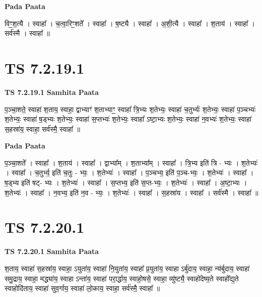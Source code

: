 \documentclass[17pt]{extarticle}
\begin{document}
\textbf{Pada Paata} \newline

विꣳ॒॒श॒त्यै । स्वाहा᳚ । च॒त्वा॒रिꣳ॒॒शते᳚ । स्वाहा᳚ । ष॒ष्ट्यै । स्वाहा᳚ । अ॒शी॒त्यै । स्वाहा᳚ । श॒ताय॑ । स्वाहा᳚ । सर्व॑स्मै । स्वाहा᳚ ॥  \newline




\section*{ TS 7.2.19.1 }

\textbf{TS 7.2.19.1 } \newline
\textbf{Samhita Paata} \newline

प॒ञ्चा॒शते॒ स्वाहा॑ श॒ताय॒ स्वाहा॒ द्वाभ्याꣳ॑ श॒ताभ्याꣳ॒॒ स्वाहा᳚ त्रि॒भ्यः श॒तेभ्यः॒ स्वाहा॑ च॒तुर्भ्यः॑ श॒तेभ्यः॒ स्वाहा॑ प॒ञ्चभ्यः॑ श॒तेभ्यः॒ स्वाहा॑ ष॒ड्भ्यः श॒तेभ्यः॒ स्वाहा॑ स॒प्तभ्यः॑ श॒तेभ्यः॒ स्वाहा᳚ ऽष्टा॒भ्यः श॒तेभ्यः॒ स्वाहा॑ न॒वभ्यः॑ श॒तेभ्यः॒ स्वाहा॑ स॒हस्रा॑य॒ स्वाहा॒ सर्व॑स्मै॒ स्वाहा᳚ ॥ \newline

\textbf{Pada Paata} \newline

प॒ञ्चा॒शते᳚ । स्वाहा᳚ । श॒ताय॑ । स्वाहा᳚ । द्वाभ्या᳚म् । श॒ताभ्या᳚म् । स्वाहा᳚ । त्रि॒भ्य इति॑ त्रि - भ्यः । श॒तेभ्यः॑ । स्वाहा᳚ । च॒तुर्भ्य॒ इति॑ च॒तुः - भ्यः॒ । श॒तेभ्यः॑ । स्वाहा᳚ । प॒ञ्चभ्य॒ इति॑ प॒ञ्च-भ्यः॒ । श॒तेभ्यः॑ । स्वाहा᳚ । ष॒ड्भ्य इति॑ षट्- भ्यः । श॒तेभ्यः॑ । स्वाहा᳚ । स॒प्तभ्य॒ इति॑ स॒प्त-भ्यः॒ । श॒तेभ्यः॑ । स्वाहा᳚ । अ॒ष्टा॒भ्यः । श॒तेभ्यः॑ । स्वाहा᳚ । न॒वभ्य॒ इति॑ न॒व - भ्यः॒ । श॒तेभ्यः॑ । स्वाहा᳚ । स॒हस्रा॑य । स्वाहा᳚ । सर्व॑स्मै । स्वाहा᳚ ॥  \newline




\section*{ TS 7.2.20.1 }

\textbf{TS 7.2.20.1 } \newline
\textbf{Samhita Paata} \newline

श॒ताय॒ स्वाहा॑ स॒हस्रा॑य॒ स्वाहा॒ ऽयुता॑य॒ स्वाहा॑ नि॒युता॑य॒ स्वाहा᳚ प्र॒युता॑य॒ स्वाहा ऽर्बु॑दाय॒ स्वाहा॒ न्य॑र्बुदाय॒ स्वाहा॑ समु॒द्राय॒ स्वाहा॒ मद्ध्या॑य॒ स्वाहा ऽन्ता॑य॒ स्वाहा॑ परा॒र्द्धाय॒ स्वाहो॒षसे॒ स्वाहा॒ व्यु॑ष्ट्यै॒ स्वाहो॑देष्य॒ते स्वाहो᳚द्य॒ते स्वाहोदि॑ताय॒ स्वाहा॑ सुव॒र्गाय॒ स्वाहा॑ लो॒काय॒ स्वाहा॒ सर्व॑स्मै॒ स्वाहा᳚ ॥ \newline
\end{document}
